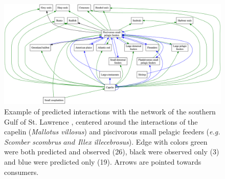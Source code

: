 \newpage
    \begin{figure}[h!]
      \centering\includegraphics[width=\textwidth]{./chapitre3/figures/SGSL.png}
      \caption{Example of predicted interactions with the network of the southern Gulf of St. Lawrence \citep{savenkoff2004}, centered around the interactions of the capelin (\textit{Mallotus villosus}) and piscivorous small pelagic feeders (\textit{e.g. Scomber scombrus $and$ Illex illecebrosus}). Edge with colors green were both predicted and observed (26), black were observed only (3) and blue were predicted only (19). Arrows are pointed towards consumers.}
      \label{fig:SGSL}
    \end{figure}
